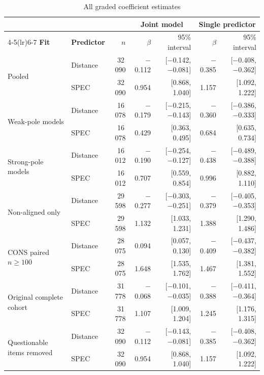 \begin{table}[htbp]
\centering
\scriptsize
\setlength{\tabcolsep}{3.5pt}\renewcommand{\arraystretch}{1.12}
\caption{All graded coefficient estimates}\label{tab:graded-all-coefficients}
\begin{tabular}{@{}llrrrrr@{}}
\toprule
 & & & \multicolumn{2}{c}{\textbf{Joint model}} & \multicolumn{2}{c}{\textbf{Single predictor}}\\
\cmidrule(lr){4-5}\cmidrule(lr){6-7}
\textbf{Fit} & \textbf{Predictor} & \textbf{$n$} & $\beta$ & 95\% interval & $\beta$ & 95\% interval\\
\midrule
\multirow{2}{*}{Pooled} & Distance & 32\,090 & $-$0.112 & [$-$0.142, $-$0.081] & $-$0.385 & [$-$0.408, $-$0.362] \\
 & SPEC & 32\,090 & 0.954 & [0.868, 1.040] & 1.157 & [1.092, 1.222] \\
\midrule
\multirow{2}{*}{Weak-pole models} & Distance & 16\,078 & $-$0.179 & [$-$0.215, $-$0.143] & $-$0.360 & [$-$0.386, $-$0.333] \\
 & SPEC & 16\,078 & 0.429 & [0.363, 0.495] & 0.684 & [0.635, 0.734] \\
\midrule
\multirow{2}{*}{Strong-pole models} & Distance & 16\,012 & $-$0.190 & [$-$0.254, $-$0.127] & $-$0.438 & [$-$0.489, $-$0.388] \\
 & SPEC & 16\,012 & 0.707 & [0.559, 0.854] & 0.996 & [0.882, 1.110] \\
\midrule
\multirow{2}{*}{Non-aligned only} & Distance & 29\,598 & $-$0.277 & [$-$0.303, $-$0.251] & $-$0.379 & [$-$0.405, $-$0.353] \\
 & SPEC & 29\,598 & 1.132 & [1.033, 1.231] & 1.388 & [1.290, 1.486] \\
\midrule
\multirow{2}{*}{CONS paired $n\geq100$} & Distance & 28\,075 & 0.094 & [0.057, 0.130] & $-$0.409 & [$-$0.437, $-$0.382] \\
 & SPEC & 28\,075 & 1.648 & [1.535, 1.762] & 1.467 & [1.381, 1.552] \\
\midrule
\multirow{2}{*}{Original complete cohort} & Distance & 31\,778 & $-$0.068 & [$-$0.101, $-$0.035] & $-$0.388 & [$-$0.411, $-$0.364] \\
 & SPEC & 31\,778 & 1.107 & [1.009, 1.204] & 1.245 & [1.176, 1.315] \\
\midrule
\multirow{2}{*}{Questionable items removed} & Distance & 32\,090 & $-$0.112 & [$-$0.143, $-$0.081] & $-$0.385 & [$-$0.408, $-$0.362] \\
 & SPEC & 32\,090 & 0.954 & [0.868, 1.040] & 1.157 & [1.092, 1.222] \\

\end{tabular}
\end{table}
